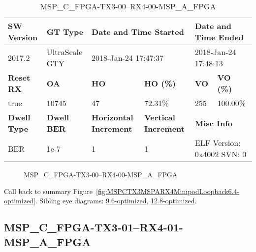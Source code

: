 \begin{table}[h]
\centering
\caption{MSP\_C\_FPGA-TX3-00--RX4-00-MSP\_A\_FPGA}
\label{tab:MSPCFPGATX300RX400MSPAFPGA6.4-optimized}
\begin{tabular}{@{}|l|l|l|l|l|l|@{}}
\toprule
\textbf{SW Version}                & \textbf{GT Type}   & \multicolumn{2}{l|}{\textbf{Date and Time Started}}            & \multicolumn{2}{l|}{\textbf{Date and Time Ended}}        \\ \midrule
2017.2                       & UltraScale GTY          & \multicolumn{2}{l|}{2018-Jan-24 17:47:37}                   & \multicolumn{2}{l|}{2018-Jan-24 17:48:13}               \\ \midrule
\textbf{Reset RX}                  & \textbf{OA} & \textbf{HO}   & \textbf{HO (\%)} & \textbf{VO} & \textbf{VO (\%)} \\ \midrule
true & 10745        & 47          & 72.31\%        & 255        & 100.00\%       \\ \midrule
\textbf{Dwell Type}                & \textbf{Dwell BER} & \textbf{Horizontal Increment} & \textbf{Vertical Increment}    & \multicolumn{2}{l|}{\textbf{Misc Info}}                  \\ \midrule
BER                            & 1e-7        & 1        & 1           & \multicolumn{2}{l|}{ELF Version: 0x4002 SVN: 0}                         \\ \bottomrule
\end{tabular}
\end{table}

\begin{figure}[h]
\caption{MSP\_C\_FPGA-TX3-00--RX4-00-MSP\_A\_FPGA} \label{fig:MSPCFPGATX300RX400MSPAFPGA6.4-optimized}
\end{figure}

Call back to summary Figure~\ref{fig:MSPCTX3MSPARX4MinipodLoopback6.4-optimized}.
Sibling eye diagrams: \hyperref[sec:MSPCFPGATX300RX400MSPAFPGA9.6-optimized]{9.6-optimized}, \hyperref[sec:MSPCFPGATX300RX400MSPAFPGA12.8-optimized]{12.8-optimized}.

\clearpage
\newpage


\subsection{MSP\_C\_FPGA-TX3-01--RX4-01-MSP\_A\_FPGA}\label{sec:MSPCFPGATX301RX401MSPAFPGA6.4-optimized}

